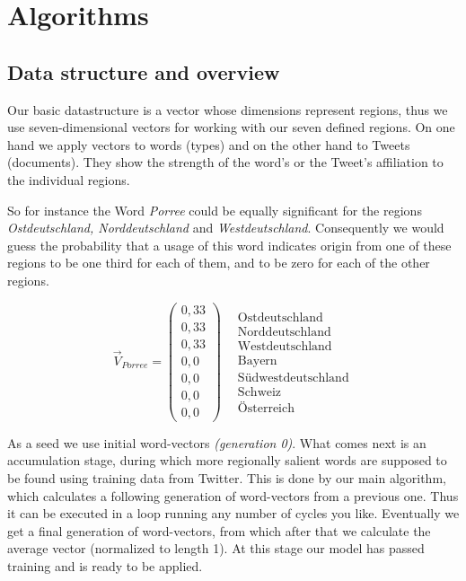 \documentclass[./Main.tex]{subfiles}
\begin{document}
\section{Algorithms}
\subsection{Data structure and overview}
Our basic datastructure is a vector whose dimensions represent regions, thus we use seven-dimensional vectors for working with our seven defined regions.
On one hand we apply vectors to words (types) and on the other hand to Tweets (documents). They show the strength of the word's or the Tweet's affiliation to the individual regions.

So for instance the Word \textit{Porree} could be equally significant for the regions \textit{Ostdeutschland, Norddeutschland} and \textit{Westdeutschland}. Consequently we would guess the probability that a usage of this word indicates origin from one of these regions to be one third for each of them, and to be zero for each of the other regions.

$$\vec V_{Porree} = \begin{pmatrix} 0,33 \\ 0,33 \\ 0,33 \\ 0,0 \\ 0,0 \\ 0,0 \\ 0,0 \end{pmatrix} \ \ \ \ \begin{matrix} \text{Ostdeutschland} \\ \text{Norddeutschland} \\ \text{Westdeutschland} \\ \text{Bayern} \\ \text{Südwestdeutschland} \\ \text{Schweiz} \\ \text{Österreich} \end{matrix}$$

As a seed we use initial word-vectors \textit{(generation 0)}. What comes next is an accumulation stage, during which more regionally salient words are supposed to be found using training data from Twitter. This is done by our main algorithm, which calculates a following generation of word-vectors from a previous one. Thus it can be executed in a loop running any number of cycles you like. Eventually we get a final generation of word-vectors, from which after that we calculate the average vector (normalized to length 1). At this stage our model has passed training and is ready to be applied.
\end{document}
